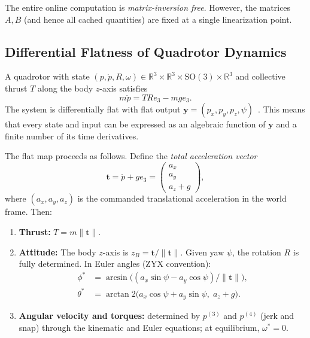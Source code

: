 \documentclass[letterpaper, 10pt, conference]{IEEEtran}
\newcommand{\R}{\mathbb{R}}
\newcommand{\bt}{\bm{t}}
\newcommand{\by}{\bm{y}}
\begin{document}
The entire online computation is \emph{matrix-inversion free}.
However, the matrices $A, B$ (and hence all cached quantities)
are fixed at a single linearization point.

\subsection{Differential Flatness of Quadrotor Dynamics}\label{sec:flatness}

A quadrotor with state
$(p, \dot{p}, R, \omega) \in \R^3 \times \R^3 \times \mathrm{SO}(3) \times \R^3$
and collective thrust $T$ along the body $z$-axis satisfies
\begin{equation}\label{eq:trans}
  m \ddot{p} = T R e_3 - m g e_3.
\end{equation}
The system is differentially flat with flat output
$\by = (p_x, p_y, p_z, \psi)$~\cite{mellinger2011,murray1995}.
This means that every state and input can be expressed as an
algebraic function of $\by$ and a finite number of its time derivatives.

The flat map proceeds as follows.
Define the \emph{total acceleration vector}
\begin{equation}\label{eq:tvec}
  \bt = \ddot{p} + g e_3 = \begin{pmatrix} a_x \\ a_y \\ a_z + g \end{pmatrix},
\end{equation}
where $(a_x, a_y, a_z)$ is the commanded translational acceleration
in the world frame.
Then:
\begin{enumerate}
  \item \textbf{Thrust:} $T = m \| \bt \|$.
  \item \textbf{Attitude:} The body $z$-axis is
    $z_B = \bt / \|\bt\|$.
    Given yaw $\psi$, the rotation $R$ is fully determined.
    In Euler angles (ZYX convention):
    \begin{align}
      \phi^* &= \arcsin\!\bigl(
        (a_x \sin\psi - a_y \cos\psi) / \|\bt\| \bigr), \label{eq:phi_eq} \\
      \theta^* &= \arctan2\!\bigl(
        a_x \cos\psi + a_y \sin\psi, \; a_z + g \bigr). \label{eq:theta_eq}
    \end{align}
  \item \textbf{Angular velocity and torques:}
    determined by $p^{(3)}$ and $p^{(4)}$ (jerk and snap) through the
    kinematic and Euler equations; at equilibrium, $\omega^* = 0$.
\end{enumerate}
\end{document}

